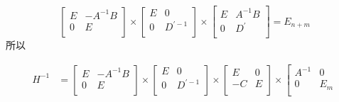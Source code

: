 \documentclass{article}
\begin{document}
\begin{enumerate}
    \begin{equation*}
        \left[
            \begin{array}{cc}
                E & -A^{-1}B \\
                0 & E \\
            \end{array}
        \right]
        \times
        \left[
            \begin{array}{cc}
                E & 0 \\
                0 & D^{\prime-1} \\
            \end{array}
        \right] 
        \times 
        \left[
            \begin{array}{cc}
                E & A^{-1}B \\
                0 & D^\prime \\
            \end{array}
        \right]
        = E_{n+m}
    \end{equation*}
    所以 
    \begin{spacing}{1.5}
    \begin{equation*}
        \begin{array}{ll}
            H^{-1} & = 
            \left[
                \begin{array}{cc}
                    E & -A^{-1}B \\
                    0 & E \\
                \end{array}
            \right]
            \times
            \left[
                \begin{array}{cc}
                    E & 0 \\
                    0 & D^{\prime-1} \\
                \end{array}
            \right] 
            \times
            \left[
                \begin{array}{cc}
                    E & 0 \\
                    -C & E \\
                \end{array}
            \right]
            \times
            \left[
                \begin{array}{cc}
                    A^{-1} & 0 \\
                    0 & E_m \\
                \end{array}

\end{array}
\end{equation*}
\end{spacing}
\end{enumerate}
\end{document}
